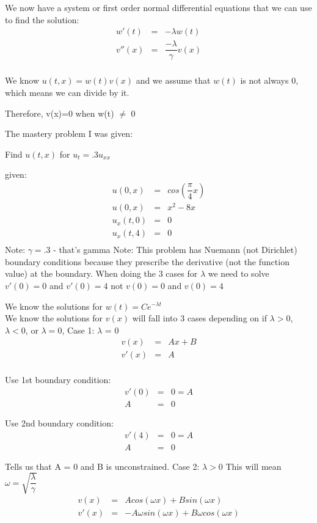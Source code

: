 \documentclass{article}
\newcommand{\bea}{\begin{eqnarray*}}
\newcommand{\eea}{\end{eqnarray*}}
\begin{document}
We now have a system or first order normal differential equations that we can use to find the solution:
\bea
w'(t) &=& -\lambda w(t) \\
v''(x) &=& \dfrac{-\lambda}{\gamma}v(x) \\
\eea

We know $u(t,x) = w(t)v(x)$ and we assume that $w(t)$ is not always 0, which means we can divide by it.

Therefore, v(x)=0 when w(t) $\neq$ 0 \newline

The mastery problem I was given: \newline

Find $u(t,x)$ for $u_t=.3u_{xx}$

given:
\bea
u(0,x)&=&cos(\dfrac{\pi}{4}x) \\
u(0,x)&=&x^2-8x\\
u_x(t,0)&=&0\\
u_x(t,4)&=&0\\
\eea
Note: $\gamma=.3$ - that's gamma \newline
Note: This problem has Nuemann (not Dirichlet) boundary conditions because they prescribe the derivative (not the function value) at the boundary. When doing the 3 cases for $\lambda$ we need to solve $v'(0)=0$ and $v'(0)=4$ not $v(0)=0$ and $v(0)=4$\newline

We know the solutions for $w(t)=Ce^{-\lambda t}$ \\

We know the solutions for $v(x)$ will fall into 3 cases depending on if $\lambda > 0$, $\lambda < 0$, or $\lambda = 0$, \newline
Case 1: $\lambda$ = 0 
\bea
v(x) &=& Ax+B\\
v'(x) &=& A\\
\eea

Use 1st boundary condition:
\bea
v'(0) &=& 0 = A\\
A &=& 0
\eea

Use 2nd boundary condition:
\bea
v'(4) &=& 0 = A\\
A &=& 0
\eea

Tells us that A = 0 and B is unconstrained.\newline
Case 2: $\lambda > 0$ This will mean $\omega=\sqrt{\dfrac{\lambda}{\gamma}}$
\bea
v(x) &=& Acos(\omega x)+Bsin(\omega x) \\
v'(x) &=& -A\omega sin(\omega x)+B\omega cos(\omega x)  \\
\eea
\end{document}
